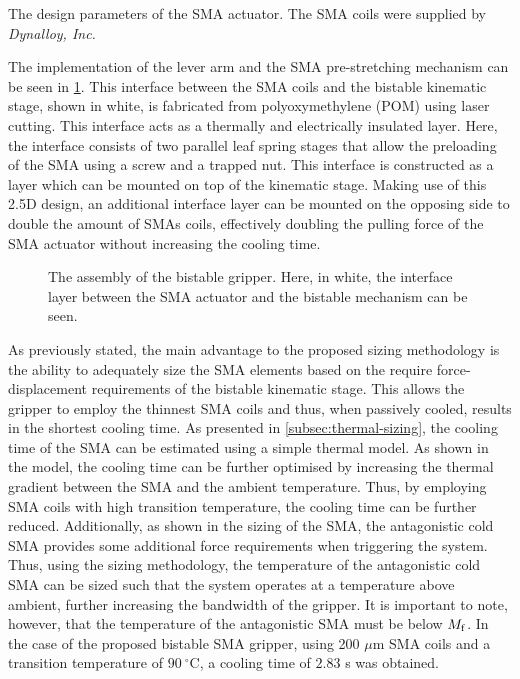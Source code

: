 \begin{table}[hbt!]
    \centering
    \caption[The design parameters of the SMA actuator]{The design parameters of the SMA actuator. The SMA coils were supplied by \textit{Dynalloy, Inc.}}
    \label{tab:sma-design-parameters}
    
\end{table}

The implementation of the lever arm and the SMA pre-stretching mechanism can be seen in \cref{fig:assembly-gripper}. This interface between the SMA coils and the bistable kinematic stage, shown in white, is fabricated from polyoxymethylene (POM) using laser cutting. This interface acts as a thermally and electrically insulated layer. Here, the interface consists of two parallel leaf spring stages that allow the preloading of the SMA using a screw and a trapped nut. This interface is constructed as a layer which can be mounted on top of the kinematic stage. Making use of this 2.5D design, an additional interface layer can be mounted on the opposing side to double the amount of SMAs coils, effectively doubling the pulling force of the SMA actuator without increasing the cooling time.

\begin{figure}[hbt!] %
  \centering
  
  \caption[The assembly of the bistable gripper]{The assembly of the bistable gripper. Here, in white, the interface layer between the SMA actuator and the bistable mechanism can be seen.}
  \label{fig:assembly-gripper}
\end{figure}

As previously stated, the main advantage to the proposed sizing methodology is the ability to adequately size the SMA elements based on the require force-displacement requirements of the bistable kinematic stage. This allows the gripper to employ the thinnest SMA coils and thus, when passively cooled, results in the shortest cooling time. As presented in \cref{subsec:thermal-sizing}, the cooling time of the SMA can be estimated using a simple thermal model. As shown in the model, the cooling time can be further optimised by increasing the thermal gradient between the SMA and the ambient temperature. Thus, by employing SMA coils with high transition temperature, the cooling time can be further reduced. Additionally, as shown in the sizing of the SMA, the antagonistic cold SMA provides some additional force requirements when triggering the system. Thus, using the sizing methodology, the temperature of the antagonistic cold SMA can be sized such that the system operates at a temperature above ambient, further increasing the bandwidth of the gripper. It is important to note, however, that the temperature of the antagonistic SMA must be below $M_\mathrm{f}$. In the case of the proposed bistable SMA gripper, using 200 $\mu$m SMA coils and a transition temperature of $90~^\circ$C, a cooling time of $2.83$ s was obtained.

